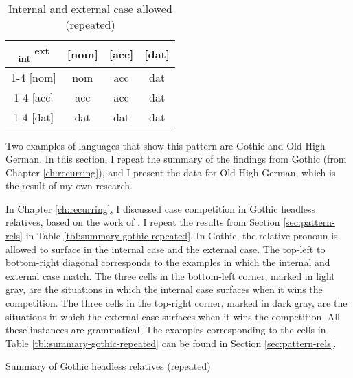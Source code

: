 \begin{table}[ht]
  \center
  \caption{Internal and external case allowed (repeated)}
  \begin{tabular}{c|c|c|c}
    \toprule
    \textsubscript{\ac{int}} \textsuperscript{\ac{ext}}
           & [\ac{nom}]
           & [\ac{acc}]
           & [\ac{dat}]
           \\ \cmidrule{1-4}
       [\ac{nom}]
           & \ac{nom}
           & \ac{acc}
           & \ac{dat}
           \\ \cmidrule{1-4}
       [\ac{acc}]
           & \ac{acc}
           & \ac{acc}
           & \ac{dat}
           \\ \cmidrule{1-4}
       [\ac{dat}]
           & \ac{dat}
           & \ac{dat}
           & \ac{dat}
           \\
     \bottomrule
  \end{tabular}
    \label{tbl:case-competition-int-ext-repeated}
\end{table}

Two examples of languages that show this pattern are Gothic and Old High German. In this section, I repeat the summary of the findings from Gothic (from Chapter \ref{ch:recurring}), and I present the data for Old High German, which is the result of my own research.

In Chapter \ref{ch:recurring}, I discussed case competition in Gothic headless relatives, based on the work of \citet{harbert1978}. I repeat the results from Section \ref{sec:pattern-rels} in Table \ref{tbl:summary-gothic-repeated}.
In Gothic, the relative pronoun is allowed to surface in the internal case and the external case. The top-left to bottom-right diagonal corresponds to the examples in which the internal and external case match. The three cells in the bottom-left corner, marked in light gray, are the situations in which the internal case surfaces when it wins the competition. The three cells in the top-right corner, marked in dark gray, are the situations in which the external case surfaces when it wins the competition.
 All these instances are grammatical. The examples corresponding to the cells in Table \ref{tbl:summary-gothic-repeated} can be found in Section \ref{sec:pattern-rels}.

\begin{table}[ht]
  \center
  \caption{Summary of Gothic headless relatives (repeated)}
    
    \label{tbl:summary-gothic-repeated}
\end{table}

